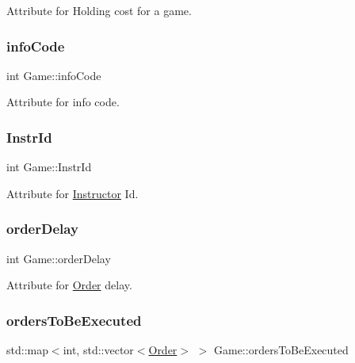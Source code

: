 Attribute for Holding cost for a game. 

\mbox{\label{class_game_ac8a93c181fc5a54ca38ad59c9bff25a0}} 
\subsubsection{\texorpdfstring{info\+Code}{infoCode}}
{\footnotesize\ttfamily int Game\+::info\+Code\hspace{0.3cm}{\ttfamily [private]}}



Attribute for info code. 

\mbox{\label{class_game_ad12306e232a5ed72de6435c77383cfe2}} 
\subsubsection{\texorpdfstring{Instr\+Id}{InstrId}}
{\footnotesize\ttfamily int Game\+::\+Instr\+Id\hspace{0.3cm}{\ttfamily [private]}}



Attribute for \hyperlink{class_instructor}{Instructor} Id. 

\mbox{\label{class_game_afc75f56db8dd8f3ffe78d670eeea536d}} 
\subsubsection{\texorpdfstring{order\+Delay}{orderDelay}}
{\footnotesize\ttfamily int Game\+::order\+Delay\hspace{0.3cm}{\ttfamily [private]}}



Attribute for \hyperlink{class_order}{Order} delay. 

\mbox{\label{class_game_ae48a7dd1eb19120b78b70d3814d207fc}} 
\subsubsection{\texorpdfstring{orders\+To\+Be\+Executed}{ordersToBeExecuted}}
{\footnotesize\ttfamily std\+::map$<$int, std\+::vector$<$\hyperlink{class_order}{Order}$>$ $>$ Game\+::orders\+To\+Be\+Executed\hspace{0.3cm}{\ttfamily [private]}}



